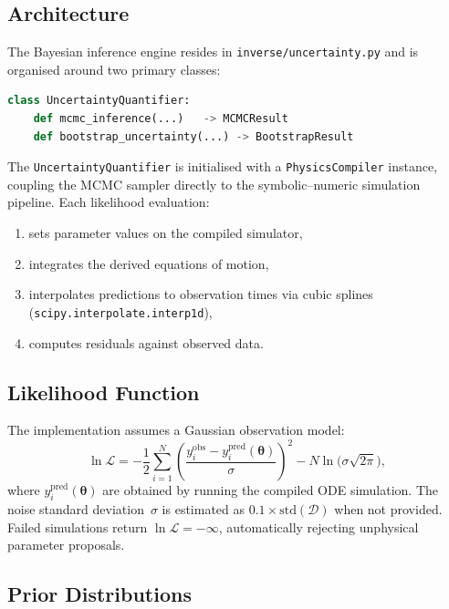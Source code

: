 \documentclass[11pt,letterpaper,twocolumn]{article}
\newcommand{\code}[1]{\texttt{#1}}
\theoremstyle{definition}
\begin{document}
\subsection{Architecture}

The Bayesian inference engine resides in \code{inverse/uncertainty.py} and is organised around two primary classes:

\begin{lstlisting}[language=Python,caption={Public API of the uncertainty module.}]
class UncertaintyQuantifier:
    def mcmc_inference(...)   -> MCMCResult
    def bootstrap_uncertainty(...) -> BootstrapResult
\end{lstlisting}

\noindent
The \code{UncertaintyQuantifier} is initialised with a \code{PhysicsCompiler} instance, coupling the MCMC sampler directly to the symbolic--numeric simulation pipeline.  Each likelihood evaluation:

\begin{enumerate}
  \item sets parameter values on the compiled simulator,
  \item integrates the derived equations of motion,
  \item interpolates predictions to observation times via cubic splines (\code{scipy.interpolate.interp1d}),
  \item computes residuals against observed data.
\end{enumerate}

\subsection{Likelihood Function}

The implementation assumes a Gaussian observation model:
\begin{equation}\label{eq:loglik}
  \ln\mathcal{L}
    = -\frac{1}{2}\sum_{i=1}^{N}\!\left(\frac{y_i^{\mathrm{obs}} - y_i^{\mathrm{pred}}(\bm{\theta})}{\sigma}\right)^{\!2}
      - N\ln\!\big(\sigma\sqrt{2\pi}\big),
\end{equation}
where $y_i^{\mathrm{pred}}(\bm{\theta})$ are obtained by running the compiled ODE simulation.  The noise standard deviation~$\sigma$ is estimated as $0.1 \times \mathrm{std}(\mathcal{D})$ when not provided.  Failed simulations return $\ln\mathcal{L} = -\infty$, automatically rejecting unphysical parameter proposals.

\subsection{Prior Distributions}
\end{document}
